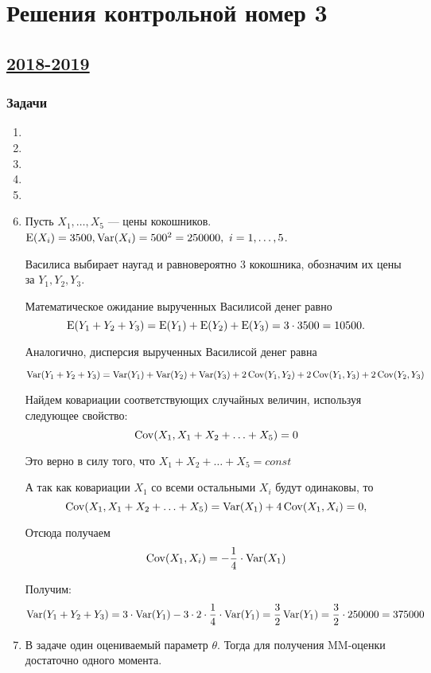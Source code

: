\thispagestyle{empty}
\section{Решения контрольной номер 3}

\subsection[2018-2019]{\hyperref[sec:kr_03_2018_2019]{2018-2019}}
\label{sec:sol_kr_03_2018_2019}
\subsubsection*{Задачи}
\begin{enumerate}
	
  \item
  \item
  \item
  \item
  \item
	\item 
	Пусть $X_1, \ldots, X_5$ — цены кокошников. $\operatorname{E} (X_i) = 3500, \operatorname{Var} (X_i) = 500^2 = 250000, \ i = 1, \ldots, 5$.

 Василиса выбирает наугад и равновероятно 3 кокошника, обозначим их цены за $Y_1, Y_2, Y_3$.

Математическое ожидание вырученных Василисой денег равно  
\[ 
\operatorname{E} (Y_1 + Y_2 + Y_3) = 
\operatorname{E} (Y_1)  + \operatorname{E} (Y_2) + \operatorname{E} (Y_3) = 3 \cdot 3500 = 10500.
\] 

 Аналогично, дисперсия вырученных Василисой денег равна

\[ 
\operatorname{Var} (Y_1 + Y_2 + Y_3) = \operatorname{Var} (Y_1) + \operatorname{Var} (Y_2) + \operatorname{Var} (Y_3) + 2 \operatorname{Cov} (Y_1, Y_2) + 2 \operatorname{Cov} (Y_1, Y_3) + 2 \operatorname{Cov} (Y_2, Y_3)
\]

 Найдем ковариации соответствующих случайных величин, используя следующее свойство: 
 \[ \operatorname{Cov} (X_1, X_1 + X_2 + \ldots + X_5) = 0\]

  Это верно в силу того, что $X_1 + X_2 + \ldots + X_5 = const $

 А так как ковариации $X_1$ со всеми остальными $X_i$ будут одинаковы, то 
\[  \operatorname{Cov} (X_1, X_1 + X_2 + \ldots + X_5) = \operatorname{Var} (X_1) + 4 \operatorname{Cov} (X_1, X_i) = 0, \] 

 Отсюда получаем 
\[ \operatorname{Cov} (X_1, X_i) = - \frac{1}{4} \cdot \operatorname{Var} (X_1) \]
 
Получим: 
\[
 \operatorname{Var} (Y_1 + Y_2 + Y_3) = 3 \cdot \operatorname{Var} (Y_1) - 3 \cdot 2 \cdot \frac{1}{4} \cdot \operatorname{Var} (Y_1) 
  = \frac{3}{2}  \operatorname{Var} (Y_1) = \frac{3}{2} \cdot 250000 = 375000 
 \]
\item
В задаче один оцениваемый параметр $\theta$. Тогда для получения MM-оценки достаточно одного момента.


\end{enumerate}
